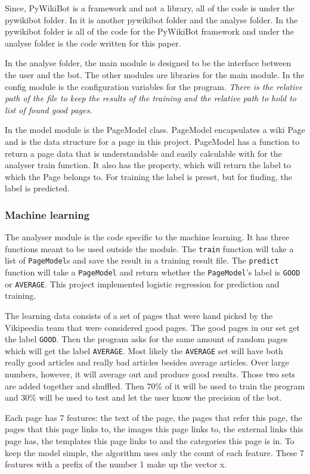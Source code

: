 Since, PyWikiBot is a framework and not a library, all of the code is under the pywikibot folder. In it is another pywikibot folder and the analyse folder. In the pywikibot folder is all of the code for the PyWikiBot framework and under the analyse folder is the code written for this paper.

In the analyse folder, the main module is designed to be the interface between the user and the bot. The other modules are libraries for the main module. In the config module is the configuration variables for the program. \emph{There is the relative path of the file to keep the results of the training and the relative path to hold to list of found good pages.}

In the model module is the PageModel class. PageModel encapsulates a wiki Page and is the data structure for a page in this project. PageModel has a function to return a page data that is understandable and easily calculable with for the analyser train function. It also has the property, which will return the label to which the Page belongs to. For training the label is preset, but for finding, the label is predicted.

\subsubsection{Machine learning}
The analyser module is the code specific to the machine learning. It has three functions meant to be used outside the module. The \verb;train; function will take a list of \verb;PageModel;s and save the result in a training result file. The \verb;predict; function will take a \verb;PageModel; and return whether the \verb;PageModel;'s label is \verb;GOOD; or \verb;AVERAGE;. This project implemented logistic regression for prediction and training.

The learning data consists of a set of pages that were hand picked by the Vikipeedia team that were considered good pages. The good pages in our set get the label \verb;GOOD;. Then the program asks for the same amount of random pages which will get the label \verb;AVERAGE;. Most likely the \verb;AVERAGE; set will have both really good articles and really bad articles besides average articles. Over large numbers, however, it will average out and produce good results. Those two sets are added together and shuffled. Then 70\% of it will be used to train the program and 30\% will be used to test and let the user know the precision of the bot.

Each page has 7 features: the text of the page, the pages that refer this page, the pages that this page links to, the images this page links to, the external links this page has, the templates this page links to and the categories this page is in. To keep the model simple, the algorithm uses only the count of each feature. These 7 features with a prefix of the number 1 make up the vector x.


